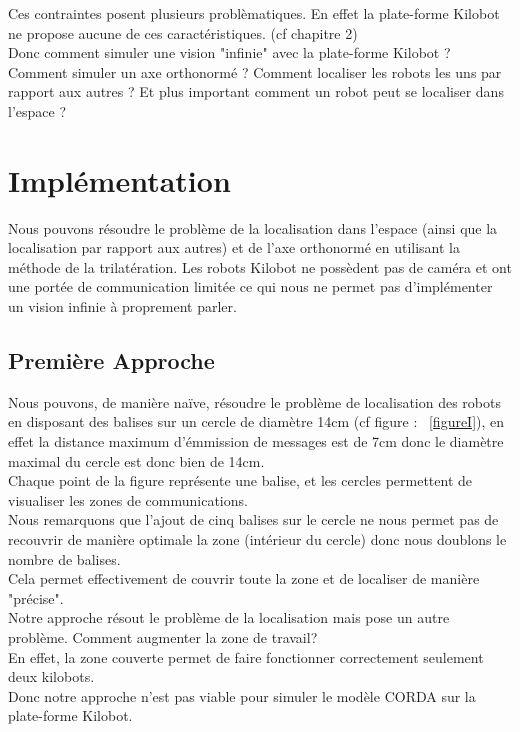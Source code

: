 \documentclass[a4paper,8pt]{report}
\begin{document}
\medskip
Ces contraintes posent plusieurs probl\`ematiques. En effet la plate-forme Kilobot ne propose aucune de ces caract\'eristiques. (cf chapitre 2)\\
Donc comment simuler une vision "infinie" avec la plate-forme Kilobot ? Comment simuler un axe orthonorm\'e ? Comment localiser les robots les uns par rapport aux autres ? Et plus important comment un robot peut se localiser dans l'espace ?\\

\section*{Impl\'ementation}\label{sec:name}

Nous pouvons r\'esoudre le probl\`eme de la localisation dans l'espace (ainsi que la localisation par rapport aux autres) et de l'axe orthonorm\'e en utilisant la m\'ethode de la trilat\'eration. Les robots Kilobot ne poss\`edent pas de cam\'era et ont une port\'ee de communication limit\'ee ce qui nous ne permet pas d'impl\'ementer un vision infinie \`a proprement parler.\\

\subsection*{Premi\`ere Approche}\label{sec:name}

Nous pouvons, de mani\`ere na\"{i}ve, r\'esoudre le probl\`eme de localisation des robots en disposant des balises sur un cercle de diam\`etre 14cm (cf figure : ~\ref{figureI}), en effet la distance maximum d'\'emmission de messages est de 7cm donc le diam\`etre maximal du cercle est donc bien de 14cm.\\
Chaque point de la figure repr\'esente une balise, et les cercles permettent de visualiser les zones de communications.\\
Nous remarquons que l'ajout de cinq balises sur le cercle ne nous permet pas de recouvrir de mani\`ere optimale la zone (int\'erieur du cercle) donc nous doublons le nombre de balises.\\
Cela permet effectivement de couvrir toute la zone et de localiser de mani\`ere "pr\'ecise".\\
Notre approche r\'esout le probl\`eme de la localisation mais pose un autre probl\`eme. Comment augmenter la zone de travail?\\
En effet, la zone couverte permet de faire fonctionner correctement seulement deux kilobots.\\
Donc notre approche n'est pas viable pour simuler le mod\`ele CORDA sur la plate-forme Kilobot.\\
\end{document}
